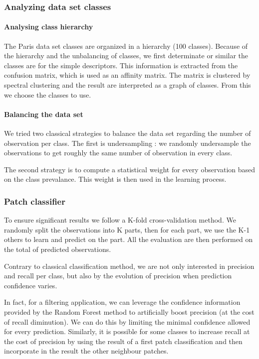 		\subsubsection{Analyzing data set classes}
			\paragraph{Analysing class hierarchy} 
				The Paris data set classes are organized in a hierarchy (100 classes). 
				Because of the hierarchy and the unbalancing of classes, we first determinate or similar the classes are for the simple descriptors. This information is extracted from the confusion matrix, which is used as an affinity matrix. The matrix is clustered by spectral clustering and the result are interpreted as a graph of classes.
				From this we choose the classes to use.
				
			\paragraph{Balancing the data set} 
				We tried two classical strategies to balance the data set regarding the number of observation per class.
				The first is undersampling : we randomly undersample the observations to get roughly the same number of observation in every class.
				
				The second strategy is to compute a statistical weight for every observation based on the class prevalance. 
				This weight is then used in the learning process.
				
		
		\subsubsection{Patch classifier}
 
				
				To ensure significant results we follow a K-fold cross-validation method. 
				We randomly split the observations into K parts, then for each part, we use the K-1 others to learn and predict on the part.
				All the evaluation are then performed on the total of predicted observations.
				
				
				Contrary to classical classification method, we are not only interested in precision and recall per class, but also by the evolution of precision when prediction confidence varies.
				
				In fact, for a filtering application, we can leverage the confidence information provided by the Random Forest method to artificially boost precision (at the cost of recall diminution). We can do this by limiting the minimal confidence allowed for every prediction.
				Similarly, it is possible for some classes to increase recall at the cost of precision by using the result of a first patch classification and then incorporate in the result the other neighbour patches. 
			 	
